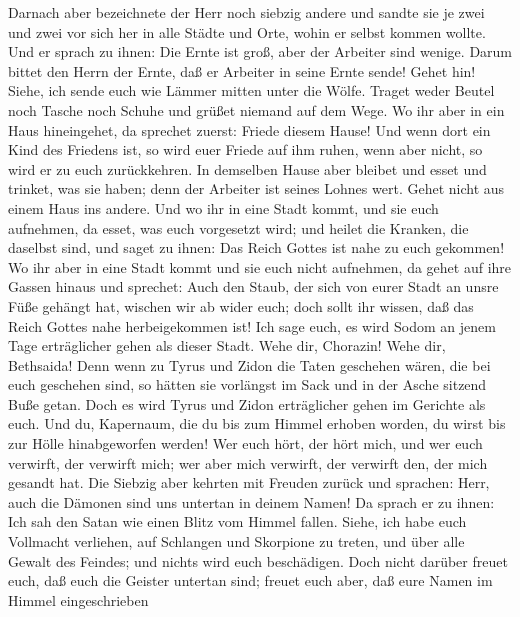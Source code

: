  Darnach aber bezeichnete der Herr noch siebzig andere und
sandte sie je zwei und zwei vor sich her in alle Städte und Orte, wohin
er selbst kommen wollte.  Und er sprach zu ihnen: Die
Ernte ist groß, aber der Arbeiter sind wenige. Darum bittet den Herrn
der Ernte, daß er Arbeiter in seine Ernte sende!  Gehet
hin! Siehe, ich sende euch wie Lämmer mitten unter die Wölfe.
 Traget weder Beutel noch Tasche noch Schuhe und grüßet
niemand auf dem Wege.  Wo ihr aber in ein Haus
hineingehet, da sprechet zuerst: Friede diesem Hause!  Und
wenn dort ein Kind des Friedens ist, so wird euer Friede auf ihm ruhen,
wenn aber nicht, so wird er zu euch zurückkehren.  In
demselben Hause aber bleibet und esset und trinket, was sie haben; denn
der Arbeiter ist seines Lohnes wert. Gehet nicht aus einem Haus ins
andere.  Und wo ihr in eine Stadt kommt, und sie euch
aufnehmen, da esset, was euch vorgesetzt wird;  und heilet
die Kranken, die daselbst sind, und saget zu ihnen: Das Reich Gottes ist
nahe zu euch gekommen!  Wo ihr aber in eine Stadt kommt
und sie euch nicht aufnehmen, da gehet auf ihre Gassen hinaus und
sprechet:  Auch den Staub, der sich von eurer Stadt an
unsre Füße gehängt hat, wischen wir ab wider euch; doch sollt ihr
wissen, daß das Reich Gottes nahe herbeigekommen ist! 
Ich sage euch, es wird Sodom an jenem Tage erträglicher gehen als dieser
Stadt.  Wehe dir, Chorazin! Wehe dir, Bethsaida! Denn
wenn zu Tyrus und Zidon die Taten geschehen wären, die bei euch
geschehen sind, so hätten sie vorlängst im Sack und in der Asche sitzend
Buße getan.  Doch es wird Tyrus und Zidon erträglicher
gehen im Gerichte als euch.  Und du, Kapernaum, die du
bis zum Himmel erhoben worden, du wirst bis zur Hölle hinabgeworfen
werden!  Wer euch hört, der hört mich, und wer euch
verwirft, der verwirft mich; wer aber mich verwirft, der verwirft den,
der mich gesandt hat.  Die Siebzig aber kehrten mit
Freuden zurück und sprachen: Herr, auch die Dämonen sind uns untertan in
deinem Namen!  Da sprach er zu ihnen: Ich sah den Satan
wie einen Blitz vom Himmel fallen.  Siehe, ich habe euch
Vollmacht verliehen, auf Schlangen und Skorpione zu treten, und über
alle Gewalt des Feindes; und nichts wird euch beschädigen.
 Doch nicht darüber freuet euch, daß euch die Geister
untertan sind; freuet euch aber, daß eure Namen im Himmel eingeschrieben
